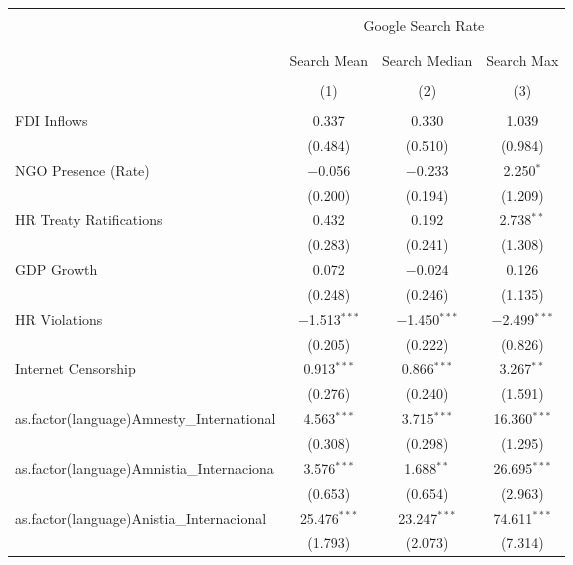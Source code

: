 
\begin{table}[!htbp] \centering 
  \caption{} 
  \label{} 
\begin{tabular}{@{\extracolsep{5pt}}lccc} 
\\[-1.8ex]\hline 
\hline \\[-1.8ex] 
 & \multicolumn{3}{c}{Google Search Rate} \\ 
\cline{2-4} 
\\[-1.8ex] & \multicolumn{3}{c}{ } \\ 
 & Search Mean & Search Median & Search Max \\ 
\\[-1.8ex] & (1) & (2) & (3)\\ 
\hline \\[-1.8ex] 
 FDI Inflows & 0.337 & 0.330 & 1.039 \\ 
  & (0.484) & (0.510) & (0.984) \\ 
  NGO Presence (Rate) & $-$0.056 & $-$0.233 & 2.250$^{*}$ \\ 
  & (0.200) & (0.194) & (1.209) \\ 
  HR Treaty Ratifications & 0.432 & 0.192 & 2.738$^{**}$ \\ 
  & (0.283) & (0.241) & (1.308) \\ 
  GDP Growth & 0.072 & $-$0.024 & 0.126 \\ 
  & (0.248) & (0.246) & (1.135) \\ 
  HR Violations & $-$1.513$^{***}$ & $-$1.450$^{***}$ & $-$2.499$^{***}$ \\ 
  & (0.205) & (0.222) & (0.826) \\ 
  Internet Censorship & 0.913$^{***}$ & 0.866$^{***}$ & 3.267$^{**}$ \\ 
  & (0.276) & (0.240) & (1.591) \\ 
  as.factor(language)Amnesty\_International & 4.563$^{***}$ & 3.715$^{***}$ & 16.360$^{***}$ \\ 
  & (0.308) & (0.298) & (1.295) \\ 
  as.factor(language)Amnistia\_Internaciona & 3.576$^{***}$ & 1.688$^{**}$ & 26.695$^{***}$ \\ 
  & (0.653) & (0.654) & (2.963) \\ 
  as.factor(language)Anistia\_Internacional & 25.476$^{***}$ & 23.247$^{***}$ & 74.611$^{***}$ \\ 
  & (1.793) & (2.073) & (7.314) \\ 

\end{tabular}
\end{table}

